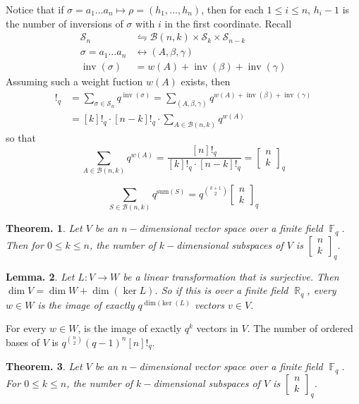 \documentclass[11pt, a4paper]{memoir}
\DeclareMathOperator{\R}{{\mathbb{R}}}
\DeclareMathOperator{\F}{{\mathbb{F}}}
\theoremstyle{change}
\newtheorem{theorem}{Theorem.}[section]
\newtheorem{lemma}[theorem]{Lemma.}
\theoremstyle{plain}
\theoremstyle{nonumberplain}
\DeclareMathOperator{\inv}{inv}
\newcommand{\sqbinom}[2]{\begin{bmatrix}#1\\#2\end{bmatrix}}
\numberwithin{equation}{section}
\begin{document}
\begin{enumerate}
        Notice that if $\sigma=a_1\ldots a_n\mapsto\rho=(h_1,\ldots,h_n)$, then for each $1\leq i\leq n$, $h_i-1$ is the number of inversions of $\sigma$ with $i$ in the first coordinate.
        Recall
        \begin{align*}
            \mathcal{S}_n&\leftrightharpoons\mathcal{B}(n,k)\times\mathcal{S}_k\times\mathcal{S}_{n-k}\\
            \sigma=a_1\ldots a_n&\leftrightarrow (A,\beta,\gamma)\\
            \inv(\sigma) &= w(A)+\inv(\beta)+\inv(\gamma)
        \end{align*}
        Assuming such a weight fuction $w(A)$ exists, then
        \begin{align*}
            [n]!_q&=\sum_{\sigma\in\mathcal{S}_n}q^{\inv(\sigma)} =\sum_{(A,\beta,\gamma)}q^{w(A)+\inv(\beta)+\inv(\gamma)}\\
                  &= [k]!_q\cdot[n-k]!_q\cdot\sum_{A\in\mathcal{B}(n,k)}q^{w(A)}
        \end{align*}
        so that
        \begin{equation*}
            \sum_{A\in\mathcal{B}(n,k)}q^{w(A)}=\frac{[n]!_q}{[k]!_q\cdot[n-k]!_q}=\sqbinom{n}{k}_q
        \end{equation*}
\end{enumerate}
\begin{equation*}
    \sum_{S\in\mathcal{B}(n,k)} q^{\text{sum}(S)} = q^{\binom{k+1}{2}}\sqbinom{n}{k}_q
\end{equation*}
\begin{theorem}
    Let $V$ be an $n-$dimensional vector space over a finite field $\F_q$.
    Then for $0\leq k\leq n$, the number of $k-$dimensional subspaces of $V$ is $\sqbinom{n}{k}_q$.
\end{theorem}
\begin{lemma}
    Let $L:V\to W$ be a linear transformation that is surjective.
    Then $\dim V=\dim W+\dim(\ker L)$.
    So if this is over a finite field $\R_q$, every $w\in W$ is the image of exactly $q^{\dim(\ker(L)}$ vectors $v\in V$.
\end{lemma}
For every $w\in W$, is the image of exactly $q^k$ vectors in $V$.
The number of ordered bases of $V$ is $q^{\binom{n}{2}}(q-1)^n[n]!_q$.
\begin{theorem}
    Let $V$ be an $n-$dimensional vector space over a finite field $\F_q$.
    For $0\leq k\leq n$, the number of $k-$dimensional subspaces of $V$ is $\sqbinom{n}{k}_q$.
\end{theorem}
\end{document}
